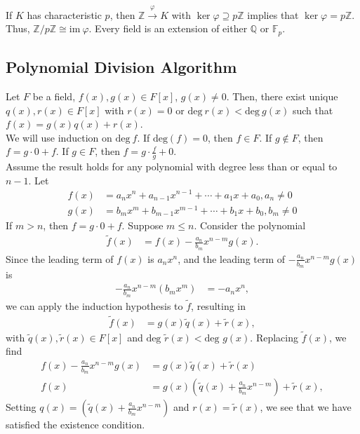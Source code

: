 \documentclass[10pt]{extarticle}
\newcommand{\Q}{\mathbb{Q}}
\newcommand{\Z}{\mathbb{Z}}
\begin{document}
  If $K$ has characteristic $p$, then $\Z\xrightarrow{\varphi}K$ with $\ker\varphi \supseteq p\Z$ implies that $\ker\varphi = p\Z$. Thus, $\Z/p\Z\cong \text{im}~\varphi$. Every field is an extension of either $\Q$ or $\mathbb{F}_p$.
  \subsection{Polynomial Division Algorithm}%
  Let $F$ be a field, $f(x),g(x)\in F[x]$, $g(x)\neq 0$. Then, there exist unique $q(x),r(x)\in F[x]$ with $r(x) = 0$ or $\text{deg}~r(x) < \text{deg}~g(x)$ such that $f(x) = g(x)q(x) + r(x)$.\\

  We will use induction on $\text{deg}~f$. If $\text{deg}(f) = 0$, then $f\in F$. If $g\notin F$, then $f = g\cdot 0 + f$. If $g\in F$, then $f = g \cdot \frac{f}{g} + 0$.\\

  Assume the result holds for any polynomial with degree less than or equal to $n-1$. Let
  \begin{align*}
    f(x) &= a_nx^n + a_{n-1}x^{n-1} + \cdots + a_1x + a_0,a_n\neq 0\\
    g(x) &= b_mx^m + b_{m-1}x^{m-1} + \cdots + b_1 x + b_0, b_m\neq 0
  \end{align*}
  If $m > n$, then $f = g\cdot 0 + f$. Suppose $m\leq n$. Consider the polynomial
  \begin{align*}
    \tilde{f}(x) &= f(x) - \frac{a_n}{b_m}x^{n-m}g(x).
  \end{align*}
  Since the leading term of $f(x)$ is $a_nx^n$, and the leading term of $-\frac{a_n}{b_m}x^{n-m}g(x)$ is 
  \begin{align*}
    -\frac{a_n}{b_m}x^{n-m}\left(b_mx^m\right) &= -a_nx^{n},
  \end{align*}
  we can apply the induction hypothesis to $\tilde{f}$, resulting in
  \begin{align*}
    \tilde{f}(x) &= g(x)\tilde{q}(x) + \tilde{r}(x),
  \end{align*}
  with $\tilde{q}(x),\tilde{r}(x) \in F[x]$ and $\text{deg }\tilde{r}(x) < \text{deg }g(x)$. Replacing $\tilde{f}(x)$, we find
  \begin{align*}
    f(x) - \frac{a_n}{b_m}x^{n-m}g(x) &= g(x)\tilde{q}(x) + \tilde{r}(x)\\
    f(x) &= g(x)\left(\tilde{q}(x) + \frac{a_n}{b_m}x^{n-m}\right) + \tilde{r}(x),
  \end{align*}
  Setting $q(x) = \left(\tilde{q}(x) + \frac{a_n}{b_m}x^{n-m}\right)$ and $r(x) = \tilde{r}(x)$, we see that we have satisfied the existence condition.
\end{document}
